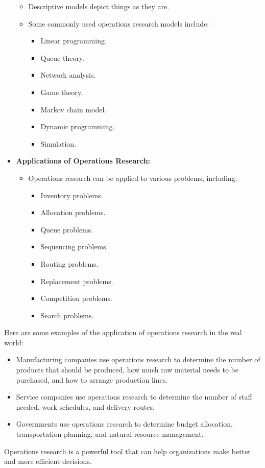 \documentclass[12pt,titlepage]{article}
\begin{document}
\begin{itemize}
\begin{itemize}
        \item Descriptive models depict things as they are.
        \item Some commonly used operations research models include:
        \begin{itemize}
            \item Linear programming.
            \item Queue theory.
            \item Network analysis.
            \item Game theory.
            \item Markov chain model.
            \item Dynamic programming.
            \item Simulation.
        \end{itemize}
    \end{itemize}
    \item \textbf{Applications of Operations Research:}
    \begin{itemize}
        \item Operations research can be applied to various problems, including:
        \begin{itemize}
            \item Inventory problems.
            \item Allocation problems.
            \item Queue problems.
            \item Sequencing problems.
            \item Routing problems.
            \item Replacement problems.
            \item Competition problems.
            \item Search problems.
        \end{itemize}
    \end{itemize}
\end{itemize}
Here are some examples of the application of operations research in the real world:
\begin{itemize}
    \item Manufacturing companies use operations research to determine the number of products that should be produced, how much raw material needs to be purchased, and how to arrange production lines.
    \item Service companies use operations research to determine the number of staff needed, work schedules, and delivery routes.
    \item Governments use operations research to determine budget allocation, transportation planning, and natural resource management.
\end{itemize}
Operations research is a powerful tool that can help organizations make better and more efficient decisions.
\end{document}
